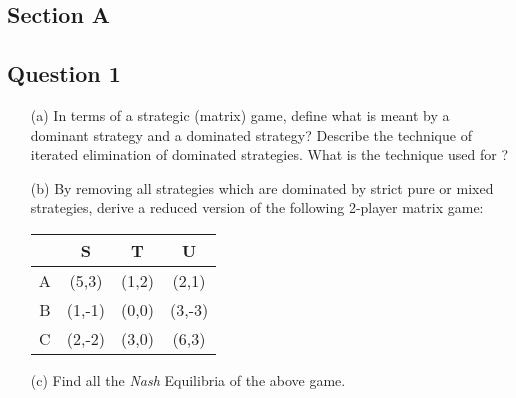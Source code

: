 \documentclass[12pt]{article}
\begin{document}
		
		
		\newpage
		
		
		\pagestyle{fancy} \setcounter{page}{1}
		\renewcommand{\headrulewidth}{0.4pt}
		\renewcommand{\headsep}{20pt}
		\lhead{\modcode \quad \modtitle \qquad \examiner} \chead{}
		\rhead{\term \setlength{\unitlength}{\baselineskip}}
		
		
		
		
		\newpage
        \begin{center} \section*{Section A} \end{center}

        \subsection*{Question 1}
        \begin{enumerate}

        \item[(a)] In terms of a strategic (matrix) game, define what is meant by a dominant strategy and a dominated strategy? Describe the technique of iterated elimination of dominated strategies. What is the technique used for ? 
        \item[(b)] By removing all strategies which are dominated by strict pure or mixed strategies, derive a reduced version of the following 2-player matrix game:

       \begin{center}

       \begin{tabular}{|c|c|c|c|}
       \hline
       & S        &T       & U    \\
       \hline
        A & (5,3) & (1,2) & (2,1) \\
       \hline
        B &(1,-1)& (0,0)& (3,-3) \\
       \hline
        C & (2,-2) & (3,0)& (6,3) \\
       \hline
       \end{tabular}


       \end{center} 

       \item[(c)] Find all the \textit{Nash} Equilibria of the above game.

       \end{enumerate}
\end{document}
